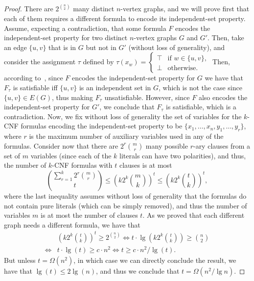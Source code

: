 \documentclass[11pt]{article}
\renewcommand{\O}{\mathcal{O}}
\begin{document}
\begin{proof}
    There are $2^{\binom{n}{2}}$ many distinct $n$-vertex graphs, and we will prove first that each of them requires a different formula to encode its independent-set property. Assume, expecting a contradiction, that some formula $F$ encodes the independent-set property for two distinct $n$-vertex graphs $G$ and $G'$. Then, take an edge $\{u, v\}$ that is in $G$ but not in $G'$ (without loss of generality), and consider the assignment $\tau$ defined by
    \(
    \tau(x_w) = \begin{cases}
        \top & \text{if } w \in \{u, v\},\\
        \bot & \text{otherwise.}
    \end{cases}
    \)
    Then, according to~, since $F$ encodes the independent-set property for $G$ we have that $F_\tau$ is satisfiable iff $\{u, v\}$ is an independent set in $G$, which is not the case since $\{u, v\} \in E(G)$, thus making $F_\tau$ unsatisfiable. However, since $F$ also encodes the independent-set property for $G'$, we conclude that $F_\tau$ is satisfiable, which is a contradiction.
    Now, we fix without loss of generality the set of variables for the $k$-CNF formulas encoding the independent-set property to be $\{x_1, \ldots, x_n, y_1, \ldots, y_r\}$, where $r$ is the maximum number of auxiliary variables used in any of the formulas.
    Consider now that there are $2^r\binom{m}{r}$ many possible $r$-ary clauses from a set of $m$ variables (since each of the $k$ literals can have two polarities), and thus, the number of $k$-CNF formulas with $t$ clauses is at most 
\[
\binom{\sum_{r=1}^{k} 2^r\binom{m}{r}}{t} \leq \left(k 2^k\binom{m}{k}\right)^t \leq \left(k 2^k \binom{t}{k}\right)^t,
\]
where the last inequality assumes without loss of generality that the formulas do not contain pure literals (which can be simply removed), and thus the number of variables $m$ is at most the number of clauses $t$. As we proved that each different graph needs a different formula, we have that 
\begin{align*}
    & \left(k 2^k \binom{t}{k}\right)^t \geq 2^{\binom{n}{2}} 
    \iff  t \cdot \lg\left(k 2^k\binom{t}{k}\right) \geq \binom{n}{2} \\
    \iff & t \cdot \lg(t) \geq c \cdot n^2 \iff t \geq c \cdot n^2 / \lg(t) \tag{for some constant $c > 0$}.
\end{align*}
But unless $t = \Omega(n^2)$, in which case we can directly conclude the result, we have that $\lg(t) \leq 2 \lg(n)$, and thus we conclude that $t = \Omega(n^2 / \lg n)$.




\end{proof}
\end{document}
